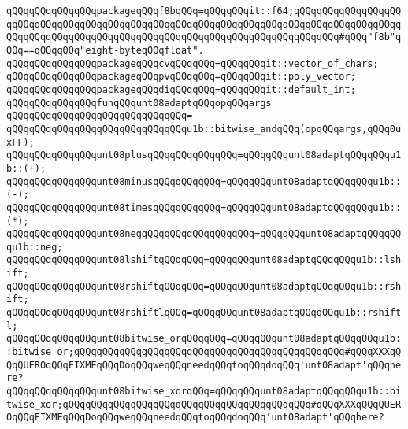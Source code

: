 \verb|qQQqqQQqqQQqqQQqpackageqQQqf8bqQQq=qQQqqQQqit::f64;qQQqqQQqqQQqqQQqqQQqqQQqqQQqqQQqqQQqqQQqqQQqqQQqqQQqqQQqqQQqqQQqqQQqqQQqqQQqqQQqqQQqqQQqqQQqqQQqqQQqqQQqqQQqqQQqqQQqqQQqqQQqqQQqqQQqqQQqqQQqqQQqqQQq#qQQq"f8b"qQQq==qQQqqQQq"eight-byteqQQqfloat".|\newline
\newline
\verb|qQQqqQQqqQQqqQQqpackageqQQqcvqQQqqQQq=qQQqqQQqit::vector_of_chars;|\newline
\verb|qQQqqQQqqQQqqQQqpackageqQQqpvqQQqqQQq=qQQqqQQqit::poly_vector;|\newline
\verb|qQQqqQQqqQQqqQQqpackageqQQqdiqQQqqQQq=qQQqqQQqit::default_int;|\newline
\newline
\verb|qQQqqQQqqQQqqQQqfunqQQqunt08adaptqQQqopqQQqargs|\newline
\verb|qQQqqQQqqQQqqQQqqQQqqQQqqQQqqQQq=|\newline
\verb|qQQqqQQqqQQqqQQqqQQqqQQqqQQqqQQqu1b::bitwise_andqQQq(opqQQqargs,qQQq0uxFF);|\newline
\newline
\verb|qQQqqQQqqQQqqQQqunt08plusqQQqqQQqqQQqqQQq=qQQqqQQqunt08adaptqQQqqQQqu1b::(+);|\newline
\verb|qQQqqQQqqQQqqQQqunt08minusqQQqqQQqqQQq=qQQqqQQqunt08adaptqQQqqQQqu1b::(-);|\newline
\verb|qQQqqQQqqQQqqQQqunt08timesqQQqqQQqqQQq=qQQqqQQqunt08adaptqQQqqQQqu1b::(*);|\newline
\verb|qQQqqQQqqQQqqQQqunt08negqQQqqQQqqQQqqQQqqQQq=qQQqqQQqunt08adaptqQQqqQQqu1b::neg;|\newline
\verb|qQQqqQQqqQQqqQQqunt08lshiftqQQqqQQq=qQQqqQQqunt08adaptqQQqqQQqu1b::lshift;|\newline
\verb|qQQqqQQqqQQqqQQqunt08rshiftqQQqqQQq=qQQqqQQqunt08adaptqQQqqQQqu1b::rshift;|\newline
\verb|qQQqqQQqqQQqqQQqunt08rshiftlqQQq=qQQqqQQqunt08adaptqQQqqQQqu1b::rshiftl;|\newline
\newline
\verb|qQQqqQQqqQQqqQQqunt08bitwise_orqQQqqQQq=qQQqqQQqunt08adaptqQQqqQQqu1b::bitwise_or;qQQqqQQqqQQqqQQqqQQqqQQqqQQqqQQqqQQqqQQqqQQqqQQq#qQQqXXXqQQqQUEROqQQqFIXMEqQQqDoqQQqweqQQqneedqQQqtoqQQqdoqQQq'unt08adapt'qQQqhere?|\newline
\verb|qQQqqQQqqQQqqQQqunt08bitwise_xorqQQq=qQQqqQQqunt08adaptqQQqqQQqu1b::bitwise_xor;qQQqqQQqqQQqqQQqqQQqqQQqqQQqqQQqqQQqqQQqqQQq#qQQqXXXqQQqQUEROqQQqFIXMEqQQqDoqQQqweqQQqneedqQQqtoqQQqdoqQQq'unt08adapt'qQQqhere?|\newline
